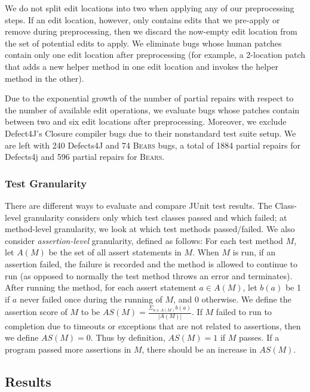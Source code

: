 \documentclass[10pt, conference]{IEEEtran}
\newcommand\bears{\textsc{Bears}\xspace}
\begin{document}
We do not split edit locations into two when applying any of our preprocessing steps. 
If an edit location, however, only contains edits that we pre-apply or remove during 
preprocessing, then we discard the now-empty edit location from the set of 
potential edits to apply. We eliminate bugs whose human patches contain only 
one edit location after preprocessing (for example, a 2-location patch that adds a new 
helper method in one edit location and invokes the helper method in the other). 

Due to the exponential growth of the number of partial repairs with respect 
to the number of available edit operations, we evaluate bugs whose patches 
contain between two and six edit locations after preprocessing.
Moreover, we exclude Defect4J's Closure compiler bugs due to 
their nonstandard test suite setup.
We are left with 240 Defects4J and 74 \bears bugs, a total of 1884 partial repairs for Defects4j 
and 596 partial repairs for \bears.

\subsubsection{Test Granularity}

There are different ways to evaluate and compare JUnit test results. The Class-level granularity 
considers only which test classes passed and which failed; at method-level 
granularity, we look at which test methods passed/failed.
We also consider \emph{assertion-level} granularity, defined as follows:
For each test method $M$, let $A(M)$ be the set of all assert statements in $M$. 
When $M$ is run, if an assertion failed, the failure is recorded and the method 
is allowed to continue to run (as opposed to normally the test method throws an 
error and terminates). After running the method, for each assert statement 
$a\in A(M)$, let $b(a)$ be 1 if $a$ never failed once during the running of $M$, 
and 0 otherwise. We define the assertion score of $M$ to be 
$AS(M)=\frac{\Sigma_{a\in A(M)}b(a)}{|A(M)|}$. If $M$ failed to run to completion 
due to timeouts or exceptions that are not related to assertions, then we define 
$AS(M)=0$. Thus by definition, $AS(M)=1$ if $M$ passes. If a program passed more 
assertions in $M$, there should be an increase in $AS(M)$.


\subsection{Results}
\end{document}
